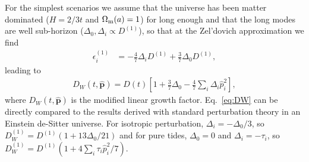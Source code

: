 \documentclass[a4paper,11pt]{article}
\newcommand{\vp}{{\bm p}}
\begin{document}
For the simplest scenarios we assume that the universe has been matter
dominated ($H = 2/3t$ and $\Omega_{\rm m}(a) = 1$) for long enough and
that the long modes are well sub-horizon ($\Delta_0, \Delta_i \propto D^{(1)}$), so
that at the Zel'dovich approximation we find
\begin{align}
    \epsilon^{(1)}_i &=
    -\frac47 \Delta_i D^{(1)} + \frac37 \Delta_0 D^{(1)}, 
\end{align}
leading to 
\begin{align}
D_W(t, \hat\vp) = D(t)\left[1 + \frac{3}{7}\Delta_0 - \frac{4}{7}\sum_i \Delta_i\hat{p}_i^2 \right],
\label{eq:DW}
\end{align}
where $D_W(t,\hat\vp)$ is the modified linear growth factor.
Eq.~\eqref{eq:DW} can be directly compared to the results derived with standard
perturbation theory in an Einstein de-Sitter universe.
For isotropic perturbation, $\Delta_i = - \Delta_0 / 3$, so $D^{(1)}_W = D^{(1)} (1 + 13
\Delta_0 / 21)$ and for pure tides, $\Delta_0=0$ and $\Delta_i = -\tau_i$, so $D^{(1)}_W = D^{(1)} (1 + 4\sum_i \tau_i\hat{p}_i^2 / 7)$.
\end{document}
